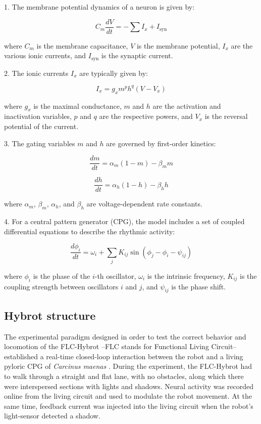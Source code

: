 1. The membrane potential dynamics of a neuron is given by:

\begin{equation}
	C_m \frac{dV}{dt} = -\sum I_x + I_{\text{syn}}
\end{equation}

where \( C_m \) is the membrane capacitance, \( V \) is the membrane potential, \( I_x \) are the various ionic currents, and \( I_{\text{syn}} \) is the synaptic current.

2. The ionic currents \( I_x \) are typically given by:

\begin{equation}
	I_x = g_x m^p h^q (V - V_x)
\end{equation}

where \( g_x \) is the maximal conductance, \( m \) and \( h \) are the activation and inactivation variables, \( p \) and \( q \) are the respective powers, and \( V_x \) is the reversal potential of the current.

3. The gating variables \( m \) and \( h \) are governed by first-order kinetics:

\begin{equation}
	\frac{dm}{dt} = \alpha_m (1 - m) - \beta_m m
\end{equation}

\begin{equation}
	\frac{dh}{dt} = \alpha_h (1 - h) - \beta_h h
\end{equation}

where \( \alpha_m \), \( \beta_m \), \( \alpha_h \), and \( \beta_h \) are voltage-dependent rate constants.

4. For a central pattern generator (CPG), the model includes a set of coupled differential equations to describe the rhythmic activity:

\begin{equation}
	\frac{d\phi_i}{dt} = \omega_i + \sum_j K_{ij} \sin(\phi_j - \phi_i - \psi_{ij})
\end{equation}

where \( \phi_i \) is the phase of the \( i \)-th oscillator, \( \omega_i \) is the intrinsic frequency, \( K_{ij} \) is the coupling strength between oscillators \( i \) and \( j \), and \( \psi_{ij} \) is the phase shift.



\subsection{Hybrot structure}
The experimental paradigm designed in order to test the correct behavior and locomotion of the FLC-Hybrot --FLC stands for Functional Living Circuit-- established a real-time closed-loop interaction between the robot and a living pyloric CPG of \textit{Carcinus maenas} \cite{elices_robust_2019}. During the experiment, the FLC-Hybrot had to walk through a straight and flat lane, with no obstacles, along which there were interspersed sections with lights and shadows. Neural activity was recorded online from the living circuit and used to modulate the robot movement. At the same time, feedback current was injected into the living circuit when the robot's light-sensor detected a shadow.

